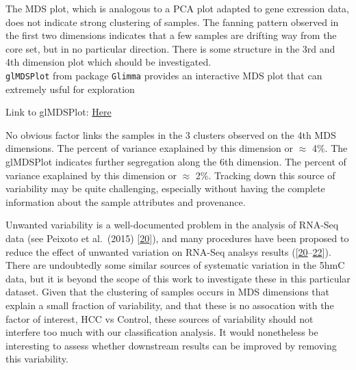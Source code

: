 \documentclass[
]{book}
\newenvironment{Shaded}{\begin{snugshade}}{\end{snugshade}}
\newcommand{\CommentTok}[1]{\textcolor[rgb]{0.56,0.35,0.01}{\textit{#1}}}
\newcommand{\DataTypeTok}[1]{\textcolor[rgb]{0.13,0.29,0.53}{#1}}
\newcommand{\KeywordTok}[1]{\textcolor[rgb]{0.13,0.29,0.53}{\textbf{#1}}}
\newcommand{\NormalTok}[1]{#1}
\newcommand{\OperatorTok}[1]{\textcolor[rgb]{0.81,0.36,0.00}{\textbf{#1}}}
\newcommand{\StringTok}[1]{\textcolor[rgb]{0.31,0.60,0.02}{#1}}
\begin{document}
The MDS plot, which is analogous to a PCA plot adapted to gene exression data,
does not indicate strong clustering of samples. The fanning pattern observed in the
first two dimensions indicates that a few samples are drifting way from the
core set, but in no particular direction. There is some structure in the
3rd and 4th dimension plot which should be investigated.\\
\texttt{glMDSPlot} from package \texttt{Glimma} provides an interactive MDS
plot that can extremely usful for exploration

\begin{Shaded}
\end{Shaded}

Link to glMDSPlot:
\href{$Static/figures//GlMDSplot.html$}{Here}

No obvious factor links the samples in the 3 clusters observed on the
4th MDS dimensions. The percent of variance exaplained by this dimension or
\(\approx\) 4\%. The glMDSPlot indicates further segregation along
the 6th dimension. The percent of variance exaplained by this dimension or
\(\approx\) 2\%. Tracking down this source of variability may be quite challenging,
especially without having the complete information about the sample attributes
and provenance.

Unwanted variability is a well-documented problem in the analysis of RNA-Seq data
(see Peixoto et al.~(2015) {[}\protect\hyperlink{ref-Peixoto:2015aa}{20}{]}), and many procedures have been proposed
to reduce the effect of unwanted variation on RNA-Seq analsys results
({[}\protect\hyperlink{ref-Peixoto:2015aa}{20}--\protect\hyperlink{ref-Risso:2014aa}{22}{]}). There are undoubtedly
some similar sources of systematic variation in the 5hmC data, but it is
beyond the scope of this work to investigate these in this particular dataset.
Given that the clustering of samples occurs in MDS dimensions that explain
a small fraction of variability, and that these is no assocation with the
factor of interest, HCC vs Control, these sources of variability should not
interfere too much with our classification analysis. It would nonetheless be interesting
to assess whether downstream results can be improved by removing this variability.
\end{document}
